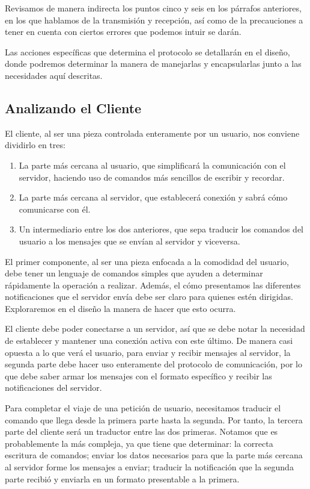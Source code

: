 \documentclass{replab}
\begin{document}
    Revisamos de manera indirecta los puntos cinco y seis en los
    párrafos anteriores, en los que hablamos de la transmisión y
    recepción, así como de la precauciones a tener en cuenta con
    ciertos errores que podemos intuir se darán.

    Las acciones específicas que determina el protocolo se detallarán
    en el diseño, donde podremos determinar la manera de manejarlas y
    encapsularlas junto a las necesidades aquí descritas.

    \subsection{Analizando el Cliente}

    El cliente, al ser una pieza controlada enteramente por un usuario,
    nos conviene dividirlo en tres:

    \begin{enumerate}
    \item La parte más cercana al usuario, que simplificará la
      comunicación con el servidor, haciendo uso de comandos más sencillos
      de escribir y recordar.
    \item La parte más cercana al servidor, que establecerá conexión y
      sabrá cómo comunicarse con él.
    \item Un intermediario entre los dos anteriores, que sepa traducir
      los comandos del usuario a los mensajes que se envían al
      servidor y viceversa.
    \end{enumerate}
    
    El primer componente, al ser una pieza enfocada a la comodidad del
    usuario, debe tener un lenguaje de comandos simples que ayuden a
    determinar rápidamente la operación a realizar. Además, el cómo
    presentamos las diferentes notificaciones que el servidor envía
    debe ser claro para quienes estén dirigidas. Exploraremos en el
    diseño la manera de hacer que esto ocurra.

    El cliente debe poder conectarse a un servidor, así que se debe
    notar la necesidad de establecer y mantener una conexión activa
    con este último. De manera casi opuesta a lo que verá el usuario,
    para enviar y recibir mensajes al servidor, la segunda parte debe
    hacer uso enteramente del protocolo de comunicación, por lo que
    debe saber armar los mensajes con el formato específico y recibir
    las notificaciones del servidor.

    Para completar el viaje de una petición de usuario, necesitamos
    traducir el comando que llega desde la primera parte hasta la
    segunda. Por tanto, la tercera parte del cliente será un traductor
    entre las dos primeras. Notamos que es probablemente la más compleja,
    ya que tiene que determinar: la correcta escritura de comandos; enviar
    los datos necesarios para que la parte más cercana al servidor forme
    los mensajes a enviar; traducir la notificación que la segunda parte
    recibió y enviarla en un formato presentable a la primera.
\end{document}
